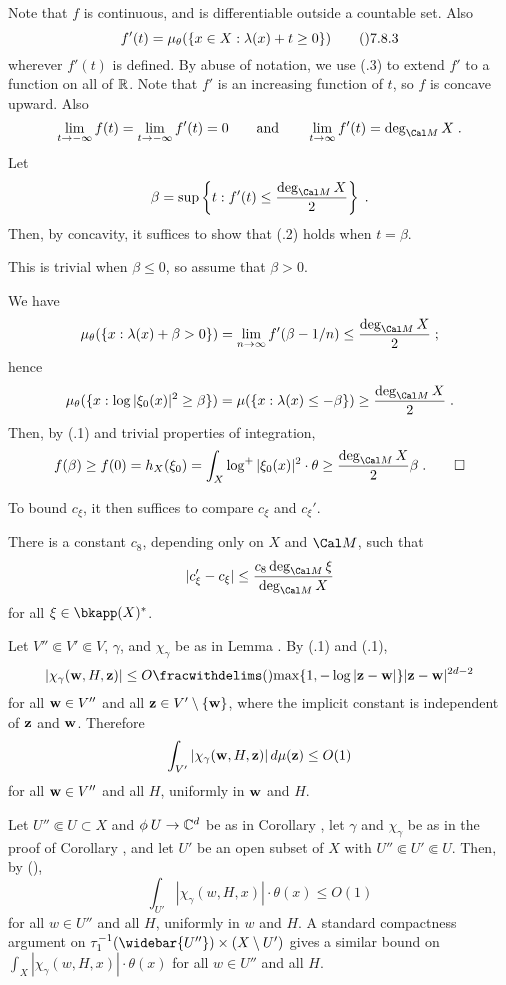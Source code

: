 Note that $f$ is continuous, and is differentiable outside a countable set.
Also
$$f'(t) = \mu_\theta(\{x\in X:\lambda(x)+t \ge 0\})\tag\07.8.3$$
wherever $f'(t)$ is defined.  By abuse of notation, we use (.3) to
extend $f'$ to a function on all of $\Bbb R$.  Note that $f'$ is
an increasing function of $t$, so $f$ is concave upward.  Also
$$\lim_{t\to-\infty} f(t) = \lim_{t\to-\infty} f'(t) = 0
  \qquad\text{and}\qquad \lim_{t\to\infty}f'(t) = \deg_{\Cal M} X\;.$$
Let
$$\beta = \sup\left\{t: f'(t)\le\frac{\deg_{\Cal M}X}{2}\right\}\;.$$
Then, by concavity, it suffices to show that (.2) holds when $t=\beta$.

This is trivial when $\beta\le0$, so assume that $\beta>0$.

We have
$$\mu_\theta(\{x:\lambda(x)+\beta>0\}) = \lim_{n\to\infty} f'(\beta-1/n)
  \le \frac{\deg_{\Cal M} X}{2}\;;$$
hence
$$\mu_\theta(\{x:\log|\xi_0(x)|^2\ge\beta\}) = \mu(\{x:\lambda(x)\le-\beta\})
  \ge \frac{\deg_{\Cal M} X}{2}\;.$$
Then, by (.1) and trivial properties of integration,
$$f(\beta) \ge f(0) = h_X(\xi_0) = \int_X\log^{+}|\xi_0(x)|^2\cdot\theta
  \ge \frac{\deg_{\Cal M} X}{2}\beta\;.\qed$$
\enddemo

To bound $c_\xi$, it then suffices to compare $c_\xi$ and $c_\xi'$.

  There is a constant $c_8$, depending only on $X$ and $\Cal M$,
such that
$$|c_\xi' - c_\xi| \le \frac{c_8\deg_{\Cal M}\xi}{\deg_{\Cal M} X}$$
for all $\xi\in\bkapp(X)^{*}$.
\endit

  Let $V''\Subset V'\Subset V$, $\gamma$, and $\chi_\gamma$
be as in Lemma .  By (.1) and (.1),
$$|\chi_\gamma(\bold w,H,\bold z)|
  \le O\fracwithdelims(){\max\{1,-\log|\bold z-\bold w|\}}
    {|\bold z-\bold w|^{2d-2}}$$
for all $\bold w\in V''$ and all $\bold z\in V'\setminus\{\bold w\}$,
where the implicit constant is independent of $\bold z$ and $\bold w$.
Therefore
$$\int_{V'} |\chi_\gamma(\bold w,H,\bold z)|\,d\mu(\bold z) \le O(1)$$
for all $\bold w\in V''$ and all $H$, uniformly in $\bold w$ and $H$.

Let $U''\Subset U\subset X$ and $\phi\:U\to\Bbb C^d$ be as in Corollary ,
let $\gamma$ and $\chi_\gamma$ be as in the proof of Corollary ,
and let $U'$ be an open subset of $X$ with $U''\Subset U'\Subset U$.
Then, by (),
$$\int_{U'} |\chi_\gamma(w,H,x)|\cdot\theta(x) \le O(1)$$
for all $w\in U''$ and all $H$, uniformly in $w$ and $H$.  A standard
compactness argument on $\tau_1^{-1}(\widebar{U''})\times(X\setminus U')$
gives a similar bound on $\int_X |\chi_\gamma(w,H,x)|\cdot\theta(x)$
for all $w\in U''$ and all $H$.

